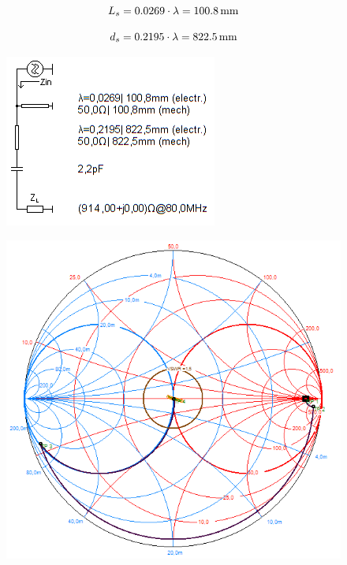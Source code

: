 \begin{equation*}
	\centering
	L_s = \num{0.0269}\cdot \lambda = \SI{100.8}{\milli\m}
\end{equation*}

\begin{equation*}
	\centering
	d_s = \num{0.2195}\cdot \lambda = \SI{822.5}{\milli\m}
\end{equation*}


\begin{figure}[H]
	\centering
	\includegraphics[scale=0.83]{imagenes/smith_stub_espacio_libre_esq.png}
	\label{fig.smith_stub_esq}
\end{figure}

\begin{figure}[H]
	\centering
	\includegraphics[scale=0.63]{imagenes/smith_stub_espacio_libre.png}
	\label{fig.smith_stub}
\end{figure}



